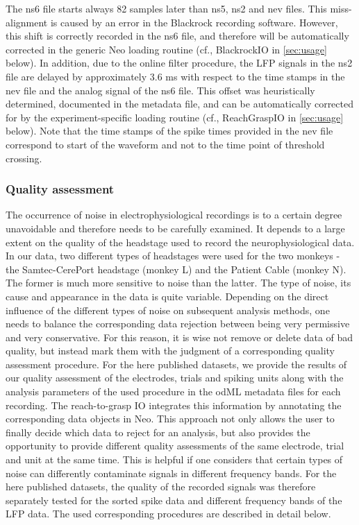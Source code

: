 {The ns6 file starts always 82 samples later than ns5, ns2 and nev files. This miss-alignment is caused by an error in the Blackrock recording software. However, this shift is correctly recorded in the ns6 file, and therefore will be automatically corrected in the generic Neo loading routine (cf., BlackrockIO in \cref{sec:usage} below). In addition, due to the online filter procedure, the LFP signals in the ns2 file are delayed by approximately 3.6 ms with respect to the time stamps in the nev file and the analog signal of the ns6 file. This offset was heuristically determined, documented in the metadata file, and can be automatically corrected for by the experiment-specific loading routine (cf., ReachGraspIO in \cref{sec:usage} below). Note that the time stamps of the spike times provided in the nev file correspond to start of the waveform and not to the time point of threshold crossing.

\subsubsection{Quality assessment}

The occurrence of noise in electrophysiological recordings is to a certain degree unavoidable and therefore needs to be carefully examined. It depends to a large extent on the quality of the headstage used to record the neurophysiological data. In our data, two different types of headstages were used for the two monkeys - the Samtec-CerePort headstage (monkey L) and the Patient Cable (monkey N). The former is much more sensitive to noise than the latter. The type of noise, its cause and appearance in the data is quite variable. Depending on the direct influence of the different types of noise on subsequent analysis methods, one needs to balance the corresponding data rejection between being very permissive and very conservative. For this reason, it is wise not remove or delete data of bad quality, but instead mark them with the judgment of a corresponding quality assessment procedure. For the here published datasets, we provide the results of our quality assessment of the electrodes, trials and spiking units along with the analysis parameters of the used procedure in the odML metadata files for each recording. The reach-to-grasp IO integrates this information by annotating the corresponding data objects in Neo. This approach not only allows the user to finally decide which data to reject for an analysis, but also provides the opportunity to provide different quality assessments of the same electrode, trial and unit at the same time. This is helpful if one considers that certain types of noise can differently contaminate signals in different frequency bands. For the here published datasets, the quality of the recorded signals was therefore separately tested for the sorted spike data and different frequency bands of the LFP data. The used corresponding procedures are described in detail below. 

}
